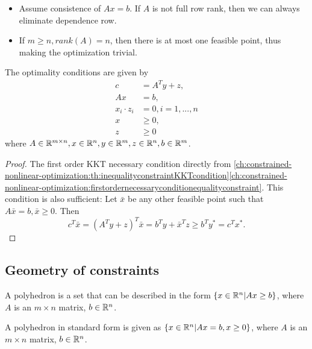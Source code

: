 \begin{refsection}
\begin{remark}[Why requires $m\leq n$ and $rank(A) = m$]\hfill
	\begin{itemize}
		\item Assume consistence of $Ax = b$. If $A$ is not full row rank, then we can always eliminate dependence row.
		\item If $m\geq n, rank(A) = n$, then there is at most one feasible point, thus making the optimization trivial.
	\end{itemize} 
\end{remark}

\begin{lemma}\label{ch:linear-optimization:th:standardformlinearprogrammingOptimalityCondition}\cite[359]{nocedal2006numerical}
	The optimality conditions are given by
	\begin{align*}
	c &= A^Ty + z,\\
	Ax &= b,\\
	x_i\cdot z_i &= 0, i=1,...,n \\
	x &\geq 0,\\ 
	z &\geq 0
	\end{align*}
	where $A\in \mathbb{R}^{m\times n}, x\in \mathbb{R}^n, y\in \mathbb{R}^m, z\in \mathbb{R}^n, b\in \mathbb{R}^m$.
\end{lemma}
\begin{proof}
	The first order KKT necessary condition directly from \autoref{ch:constrained-nonlinear-optimization:th:inequalityconstraintKKTcondition}\autoref{ch:constrained-nonlinear-optimization:firstordernecessaryconditionequalityconstraint}. This condition is also sufficient:
	Let $\bar{x}$ be any other feasible point such that $A\bar{x} = b, \bar{x}\geq 0$. Then
	$$c^T\bar{x} = (A^Ty + z)^T\bar{x} = b^Ty + \bar{x}^Tz \geq b^Ty^* = c^Tx^*.$$
\end{proof}


\subsection{Geometry of constraints}

\begin{definition}[polyhedron]
	\cite[42]{bertsimas1997introduction} A polyhedron is a set that can be described in the form $\{x\in\mathbb{R}^n | Ax \geq b\}$, where $A$ is an $m\times n$ matrix, $b\in \mathbb{R}^n$.
\end{definition}

\begin{definition}
	\cite[53]{bertsimas1997introduction}
	A polyhedron in standard form is given as
	$\{x\in\mathbb{R}^n | Ax = b, x\geq 0\}$, where $A$ is an $m\times n$ matrix, $b\in \mathbb{R}^n$.
\end{definition}


\end{refsection}
